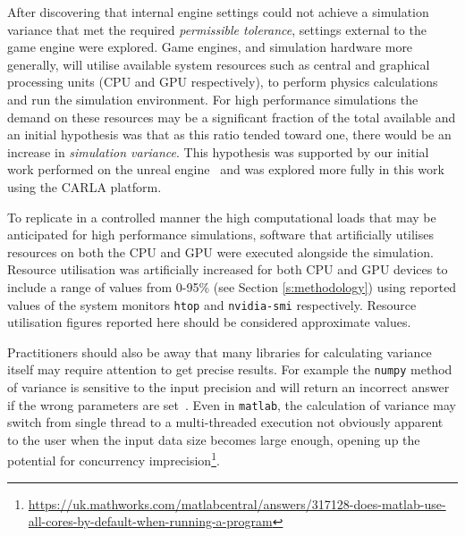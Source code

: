 \documentclass[letterpaper, 10 pt, journal, twoside]{IEEEtran}
\begin{document}
After discovering that internal engine settings could not achieve a simulation variance that met the required 
\textit{permissible tolerance}, 
settings external to the game engine were explored. 
%
Game engines, and simulation hardware more generally, will utilise available system resources such as central and graphical processing units (CPU and GPU respectively), to perform physics calculations and run the simulation environment. 
%
For high performance simulations the demand on these resources may be a significant fraction of the total available and an initial hypothesis was that as this ratio tended toward one, there would be an increase in \textit{simulation variance}. This hypothesis was supported by our initial work performed on the unreal engine~\cite{TSLUnrealEngineTesting} and was explored more fully in this work using the CARLA platform.

To replicate in a controlled manner the high computational loads that may be anticipated for high performance simulations, software that artificially utilises resources on both the CPU and GPU were executed alongside the simulation. 
%
Resource utilisation was artificially increased for both CPU and GPU devices to include a range of values from 0-95\% (see Section \ref{s:methodology}) using reported values of the system monitors \texttt{htop} and \texttt{nvidia-smi} respectively. Resource utilisation figures reported here should be considered approximate values.

Practitioners should also be away that many libraries for calculating variance itself may require attention to get precise results. For example the \texttt{numpy} method of variance is sensitive to the input precision and will return an incorrect answer if the wrong parameters are set~\cite{NumpyVar}. Even in \texttt{matlab}, the calculation of variance may switch from single thread to a multi-threaded execution not obviously apparent to the user when the input data size becomes large enough, opening up the potential for concurrency imprecision\footnote{\url{https://uk.mathworks.com/matlabcentral/answers/317128-does-matlab-use-all-cores-by-default-when-running-a-program}}. 
\end{document}
